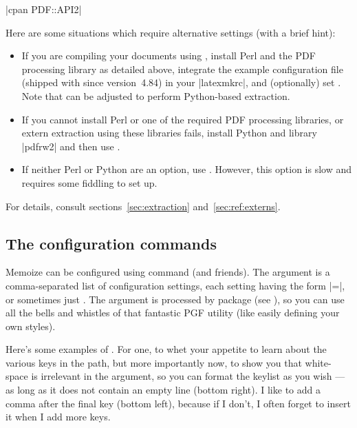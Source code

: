 \documentclass[a4paper,11pt]{article}
\begin{document}
\begin{tcolorbox}[fontupper=\small]
  |cpan PDF::API2|
\end{tcolorbox}%

\bigskip

\begin{tcolorbox}[title=The default settings won't cut it for me!]
  Here are some situations which require alternative settings (with a brief
  hint):
  \begin{itemize}
  \item If you are compiling your documents using , install Perl
    and the PDF processing library as detailed above, integrate the example
    configuration file  (shipped with 
    since version~4.84) in your |latexmkrc|, and (optionally) set
    .  Note that
     can be adjusted to perform Python-based
    extraction.
  \item If you cannot install Perl or one of the required PDF processing
    libraries, or extern extraction using these libraries fails, install Python
    and library |pdfrw2| and then use
    .
  \item If neither Perl or Python are an option, use
    .  However, this option is slow
    and requires some fiddling to set up.
  \end{itemize}
  For details, consult sections~\ref{sec:extraction} and~\ref{sec:ref:externs}.
\end{tcolorbox}


\subsection{The configuration commands}
\label{sec:mmzset}

Memoize can be configured using command 
(and friends). The  argument is a comma-separated list of
configuration settings, each setting having the form |=|,
or sometimes just .  The  argument is processed by package
 (see ), so you can use all the bells and whistles
of that fantastic PGF utility (like easily defining your own styles).

Here's some examples of .  For one, to whet your appetite to
learn about the various keys in the  path, but more
importantly now, to show you that white-space is irrelevant in the
 argument, so you can format the keylist as you wish --- as long
as it does not contain an empty line (bottom right).  I like to add a comma
after the final key (bottom left), because if I don't, I often forget to insert
it when I add more keys.
\end{document}
